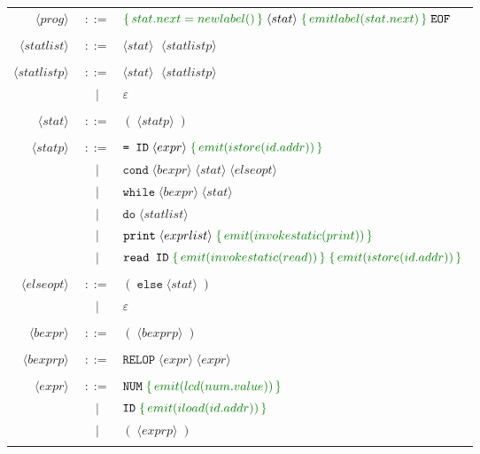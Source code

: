\documentclass{article}
\newcommand{\cmd}[1]{\textcolor{MyGreen}{\{\, #1 \,\}} \;}
\newcommand{\node}[1]{\langle #1 \rangle \;}
\begin{document}
  \begin{center}
    \begin{tabular}{ r c l }
      $\node{prog}$       & $::=$ & $\cmd{stat.next = newlabel()} \node{stat} \cmd{emitlabel(stat.next)} \texttt{EOF}$ \\\\
      $\node{statlist}$   & $::=$ & $\node{stat}$ $\node{statlistp}$ \\\\
      $\node{statlistp}$  & $::=$ & $\node{stat}$ $\node{statlistp}$ \\
                          &  $|$  & $\varepsilon$ \\\\
      $\node{stat}$       & $::=$ & $(\; \node{statp})$ \\\\
      $\node{statp}$      & $::=$ & $\texttt{= ID}\; \node{expr} \cmd{emit(istore(id.addr))}$ \\
                          &  $|$  & $\texttt{cond}\; \node{bexpr} \node{stat} \node{elseopt}$\\
                          &  $|$  & $\texttt{while}\; \node{bexpr} \node{stat}$ \\
                          &  $|$  & $\texttt{do}\; \node{statlist}$ \\
                          &  $|$  & $\texttt{print}\; \node{exprlist} \cmd{emit(invokestatic(print))}$ \\
                          &  $|$  & $\texttt{read ID}\; \cmd{emit(invokestatic(read))} \cmd{emit(istore(id.addr))}$ \\\\
      $\node{elseopt}$    & $::=$ & $(\; \texttt{else}\; \node{stat})$ \\
                          &  $|$  & $\varepsilon$ \\\\
      $\node{bexpr}$      & $::=$ & $(\; \node{bexprp} )$ \\\\
      $\node{bexprp}$     & $::=$ & $\texttt{RELOP}\; \node{expr} \node{expr}$ \\\\
      $\node{expr}$       & $::=$ & $\texttt{NUM}\; \cmd{emit(lcd(num.value))}$ \\
                          &  $|$  & $\texttt{ID}\; \cmd{emit(iload(id.addr))}$\\
                          &  $|$  & $(\; \node{exprp} )$ \\\\

\end{tabular}
\end{center}
\end{document}
